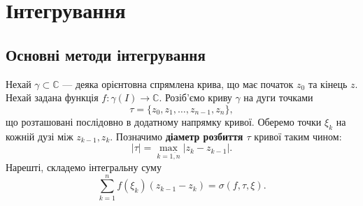 \documentclass{math_library}
\begin{document}
\newpage
		
\section{Інтегрування}
\subsection{Основні методи інтегрування}

Нехай $\gamma \subset \mathbb{C}$ --- деяка орієнтовна спрямлена крива, що має початок $z_0$ та кінець $z$. Нехай задана функція $f \colon \gamma(I) \to \mathbb{C}$. Розіб'ємо криву $\gamma$ на дуги точками 
\[
\tau = \{z_0,z_1,\dots,z_{n-1},z_n\},
\]
що розташовані послідовно в додатному напрямку кривої. Оберемо точки $\xi_k$ на кожній дузі між $z_{k-1},z_k$. Позначимо \textbf{діаметр розбиття $\tau$} кривої таким чином:
\[
|\tau| =\max_{k = \overline{1,n}} |z_{k}-z_{k-1}|.
\]
Нарешті, складемо інтегральну суму 
\[
\sum_{k=1}^n f(\xi_k) (z_{k-1}-z_k) = \sigma(f,\tau,\xi).
\]
	
\end{document}
